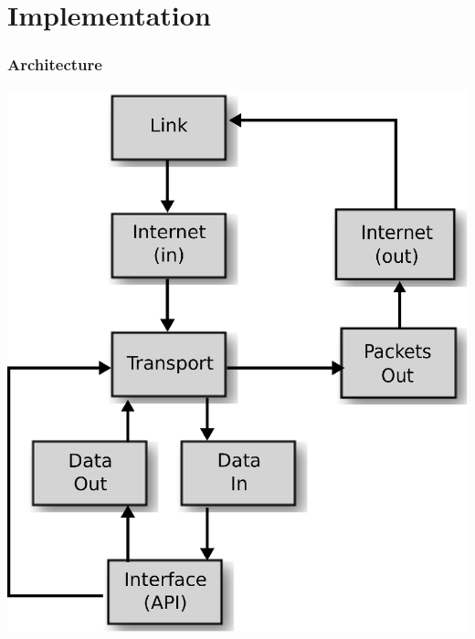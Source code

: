 \documentclass{beamer}
\begin{document}
\section{Implementation}
\begin{frame}
  \frametitle{Architecture}
  \begin{center}
    \includegraphics[scale=0.5]{graph}
  \end{center}


\end{frame}
\end{document}
